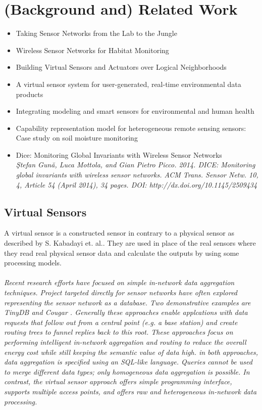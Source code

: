 \documentclass[USenglish]{uit-thesis}
\begin{document}
\chapter{(Background and) Related Work}
\begin{itemize}
\item Taking Sensor Networks from the Lab to the Jungle
\item Wireless Sensor Networks for Habitat Monitoring
\item Building Virtual Sensors and Actuators over Logical Neighborhoods
\item A virtual sensor system for user-generated, real-time environmental data products
\item Integrating modeling and smart sensors for environmental and human health
\item Capability representation model for heterogeneous remote sensing sensors: Case study on soil moisture monitoring
\item Dice: Monitoring Global Invariants with Wireless Sensor Networks 
\\ \em{Ştefan Gună, Luca Mottola, and Gian Pietro Picco. 2014. DICE: Monitoring global invariants with wireless
sensor networks. ACM Trans. Sensor Netw. 10, 4, Article 54 (April 2014), 34 pages.}
DOI: http://dx.doi.org/10.1145/2509434
\end{itemize}


\section{Virtual Sensors}
A virtual sensor is a constructed sensor in contrary to a physical sensor as described by S. Kabadayi et. al.\cite{VirtualSensors2006}. They are used in place of the real sensors where they read real physical sensor data and calculate the outputs by using some processing models.
\\ \\
\emph{Recent research efforts have focused on simple in-network data aggregation techniques. Project targeted directly for sensor networks have often explored representing the sensor network as a database. Two demonstrative examples are TinyDB \cite{tinyDB} and Cougar \cite{cougar}. Generally these approaches enable applcations with data requests that follow out from a central point (e.g. a base station) and create routing trees to funnel replies back to this root. These approaches focus on performing intelligent in-network aggregation and routing to reduce the overall energy cost while still keeping the semantic value of data high. in both approaches, data aggregation is specified using an SQL-like language. Queries cannot be used to merge different data types; only homogeneous data aggregation is possible. In contrast, the virtual sensor approach offers simple programming interface, supports multiple access points, and offers raw and heterogeneous in-network data processing.}
\end{document}
